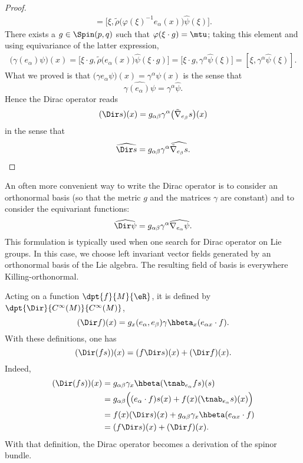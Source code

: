 \begin{proof}
\begin{align*}
		=\big[ \xi,\tilde\rho\big( \varphi(\xi)^{-1}e_{\alpha}(x) \big)\hat{\psi}(\xi) \big].
\end{align*}
There exists a $g\in\Spin(p,q)$ such that $\varphi(\xi\cdot g)=\mtu$; taking this element and using equivariance of the latter expression,
\begin{align}
  \big( \gamma(e_{\alpha})\psi \big)(x)=\big[ \xi\cdot g,\tilde\rho\big( e_{\alpha}(x) \big)\hat{\psi}(\xi\cdot g) \big]
		=\big[ \xi\cdot g,\gamma^{\alpha}\hat{\psi}(\xi) \big]
		=[\xi,\gamma^{\alpha}\hat{\psi}(\xi)].
\end{align}
What we proved is that $\big( \gamma e_{\alpha}\psi \big)(x)=\gamma^{\alpha}\psi(x)$ is the sense that
\begin{equation}
	\widehat{\gamma(e_{\alpha})\psi}=\gamma^{\alpha}\hat{\psi}.
\end{equation}
Hence the Dirac operator reads
\[ 
  (\Dir s)(x)=g_{\alpha\beta}\gamma^{\alpha}\big( \tilde\nabla_{e_{\beta}}s \big)(x)
\]
in the sense that
\begin{equation}
\widehat{\Dir s}=g_{\alpha\beta}\gamma^{\alpha}\widehat{  \tilde\nabla_{e_{\beta}}s }.
\end{equation}

\end{proof}


An often more convenient way to write the Dirac operator is to consider an orthonormal basis (so that the metric $g$ and the matrices $\gamma$ are constant) and to consider the equivariant functions:
\[ 
  \widehat{\Dir\psi}=g_{\alpha\beta}\gamma^{\alpha}\widehat{\nabla_{e_{\alpha}}\psi}.
\]
This formulation is typically used when one search for Dirac operator on Lie groups. In this case, we choose left invariant vector fields generated by an orthonormal basis of the Lie algebra. The resulting field of basis is everywhere Killing-orthonormal.

Acting on a function $\dpt{f}{M}{\eR}$, it is defined by $\dpt{\Dir}{C^{\infty}(M)}{C^{\infty}(M)}$,
\begin{equation} \label{eq_defDirac_f}
(\Dir f)(x)=g_x(e_{\alpha},e_{\beta})\gamma\hbeta_x(e_{\alpha x}\cdot f).
\end{equation}
With these definitions, one has
\[(\Dir(fs))(x)=(f\Dir s)(x)+(\Dir f)(x).\] Indeed,
\begin{equation}
\begin{split}
   (\Dir(fs))(x)&=g_{\alpha\beta}\gamma_x\hbeta(\tnab_{e_{\alpha}}fs)(s)\\
                &=g_{\alpha\beta}\Big((e_{\alpha}\cdot f)s(x)+f(x)(\tnab_{e_{\alpha}}s)(x)\Big)\\
                &=f(x)(\Dir s)(x)+g_{\alpha\beta}\gamma_x\hbeta(e_{\alpha x}\cdot f)\\
                &=(f\Dir s)(x)+(\Dir f)(x).
\end{split}
\end{equation}
With that definition, the Dirac operator becomes a derivation of the spinor bundle.


